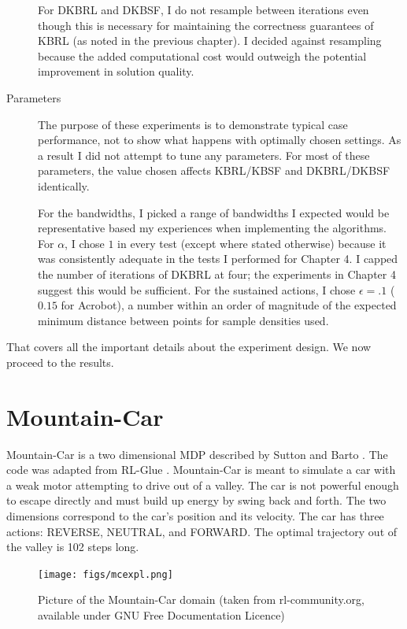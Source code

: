 \begin{description}
For DKBRL and DKBSF, I do not resample between iterations even though this
is necessary for maintaining the correctness guarantees of KBRL (as noted in
the previous chapter).
I decided against resampling because the added computational cost would
outweigh the potential improvement in solution quality.

\item[Parameters]
The purpose of these experiments is to demonstrate typical case performance,
not to show what happens with optimally chosen settings.
As a result I did not attempt to tune any parameters.
For most of these parameters, the value chosen affects KBRL/KBSF and
DKBRL/DKBSF identically.

For the bandwidths, I picked a range of bandwidths I expected would be
representative based my experiences when implementing the algorithms.
For $\alpha$, I chose $1$ in every test (except where stated otherwise) because
it was consistently adequate in the tests I performed for Chapter 4.
I capped the number of iterations of DKBRL at four; the experiments in
Chapter 4 suggest this would be sufficient.
For the sustained actions, I chose $\epsilon=.1$ ($0.15$ for Acrobot),
a number within an order of magnitude of the expected minimum distance between
points for sample densities used.
\end{description}
That covers all the important details about the experiment design.
We now proceed to the results.

\section{Mountain-Car}
Mountain-Car is a two dimensional MDP described by Sutton and Barto
\cite{rlai}.
The code was adapted from RL-Glue \cite{rlglue} .
Mountain-Car is meant to simulate a car with a weak motor attempting to
drive out of a valley.
The car is not powerful enough to escape directly and must build up
energy by swing back and forth.
The two dimensions correspond to the car's position and its velocity.
The car has three actions: REVERSE, NEUTRAL, and FORWARD.
The optimal trajectory out of the valley is 102 steps long.

\begin{figure}[!!!ht]
  \centering
    \texttt{[image: figs/mcexpl.png]}
  \caption[Mountain-Car domain]{Picture of the Mountain-Car domain
(taken from rl-community.org, available under GNU Free Documentation Licence)}
\end{figure}

